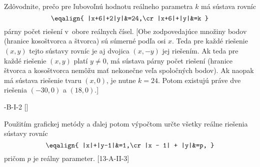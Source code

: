 {Zdôvodnite, prečo pre ľubovoľnú hodnotu reálneho
parametra $k$ má sústava rovníc
$$\eqalign{
|x+6|+2|y|&=24,\cr
|x+6|+|y|&=k
}$$
párny počet riešení v~obore reálnych čísel.
[Obe zodpovedajúce množiny bodov (hranice kosoštvorca a štvorca)
sú súmerné podľa osi $x$. Teda pre každé riešenie $(x,y)$
tejto sústavy rovníc je aj dvojica $(x,{-y})$ jej riešením.
Ak teda pre každé riešenie $(x,y)$ platí $y\ne0$, má sústava
párny počet riešení (hranice štvorca a kosoštvorca nemôžu mať
nekonečne veľa spoločných bodov). Ak naopak má sústava
riešenie tvaru $(x,0)$, je nutne $k=24$. Potom existujú práve
dve riešenia $({-30},0)$ a $(18,0)$.]

\DOP
{}-B-I-2
[]


Použitím grafickej metódy a ďalej potom
výpočtom určte všetky reálne riešenia sústavy rovníc
$$
\eqalign{
|x|+|y-1|&=1,\cr
|x - 1| + |y|&=p,
}$$
pričom $p$ je reálny parameter.
[13-A-II-3]

}

